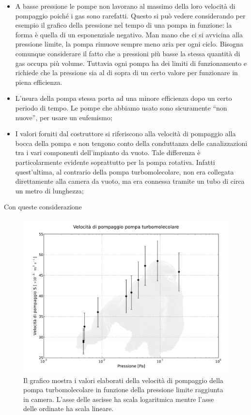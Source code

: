 \begin{itemize}
    \item{A basse pressione le pompe non lavorano al massimo della loro velocità di pompaggio poiché i gas sono rarefatti.
        Questo si può vedere considerando per esempio il grafico della pressione nel tempo di una pompa in funzione:
        la forma è quella di un esponenziale negativo. Man mano che ci si avvicina alla pressione limite, la pompa rimuove
        sempre meno aria per ogni ciclo. Bisogna comunque considerare il fatto che a pressioni più basse la stessa quantità di gas
        occupa più volume. Tuttavia ogni pompa ha dei limiti di funzionamento e richiede che la pressione sia al di sopra di un
        certo valore per funzionare in piena efficienza.}
	\item{L'usura della pompa stessa porta ad una minore efficienza dopo un certo periodo di tempo. Le pompe che abbiamo
        usato sono sicuramente ``non nuove'', per usare un eufemismo;}
	\item{I valori forniti dal costruttore si riferiscono alla velocità di pompaggio alla bocca della pompa e non tengono
        conto della conduttanza delle canalizzazioni tra i vari componenti dell'impianto da vuoto. Tale differenza è
        particolarmente evidente soprattutto per la pompa rotativa. Infatti quest'ultima, al contrario della pompa
        turbomolecolare, non era collegata direttamente alla camera da vuoto, ma era connessa tramite un tubo di
        circa un metro di lunghezza;}
\end{itemize}

Con queste considerazione

\begin{figure}[h!]
	\centering
		\includegraphics[width=145mm]{turbo.pdf}
	\caption{Il grafico mostra i valori elaborati della velocità di pompaggio della pompa turbomolecolare in funzione della pressione limite raggiunta in camera. L'asse delle ascisse ha scala logaritmica mentre l'asse delle ordinate ha scala lineare.}
		\label{fig:turbo}
\end{figure}
